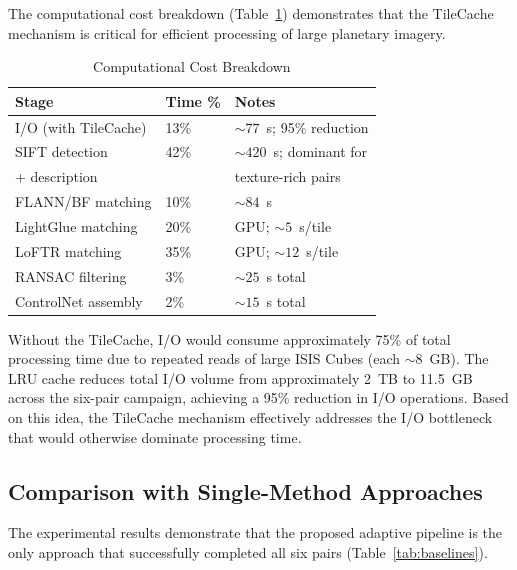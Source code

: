 \documentclass[lettersize,journal]{IEEEtran}
\begin{document}
The computational cost breakdown (Table~\ref{tab:performance}) demonstrates that the TileCache mechanism is critical for efficient processing of large planetary imagery.

\begin{table}[htbp]
\caption{Computational Cost Breakdown}
\label{tab:performance}
\centering
\begin{tabular}{@{}lll@{}}
\toprule
\textbf{Stage} & \textbf{Time \%} & \textbf{Notes} \\
\midrule
I/O (with TileCache) & 13\% & ${\sim}77$~s; 95\% reduction \\
SIFT detection & 42\% & ${\sim}420$~s; dominant for \\
+ description &  & texture-rich pairs \\
FLANN/BF matching & 10\% & ${\sim}84$~s \\
LightGlue matching & 20\% & GPU; ${\sim}5$~s/tile \\
LoFTR matching & 35\% & GPU; ${\sim}12$~s/tile \\
RANSAC filtering & 3\% & ${\sim}25$~s total \\
ControlNet assembly & 2\% & ${\sim}15$~s total \\
\bottomrule
\end{tabular}
\end{table}

Without the TileCache, I/O would consume approximately 75\% of total processing time due to repeated reads of large ISIS Cubes (each ${\sim}8$~GB). The LRU cache reduces total I/O volume from approximately 2~TB to 11.5~GB across the six-pair campaign, achieving a 95\% reduction in I/O operations. Based on this idea, the TileCache mechanism effectively addresses the I/O bottleneck that would otherwise dominate processing time.

\subsection{Comparison with Single-Method Approaches}

The experimental results demonstrate that the proposed adaptive pipeline is the only approach that successfully completed all six pairs (Table~\ref{tab:baselines}).
\end{document}
